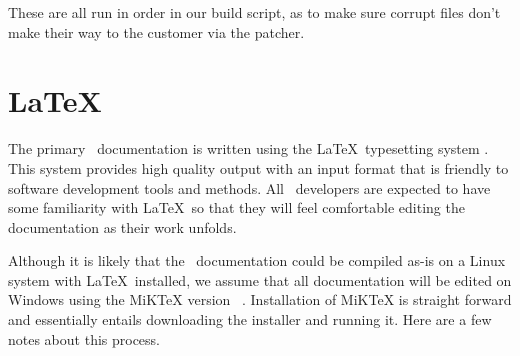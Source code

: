These are all run in order in our build script, as to make sure corrupt files don't make their way to the customer via the patcher.

\section{\LaTeX}

The primary \VTank\ documentation is written using the \LaTeX\ typesetting system \cite{latex}. This system provides high quality output with an input format that is friendly to software development tools and methods. All \VTank\ developers are expected to have some familiarity with \LaTeX\ so that they will feel comfortable editing the documentation as their work unfolds.

Although it is likely that the \VTank\ documentation could be compiled as-is on a Linux system with \LaTeX\ installed, we assume that all documentation will be edited on Windows using the MiKTeX version \MiKTeXVersion\ \cite{miktex}. Installation of MiKTeX is straight forward and essentially entails downloading the installer and running it. Here are a few notes about this process.

